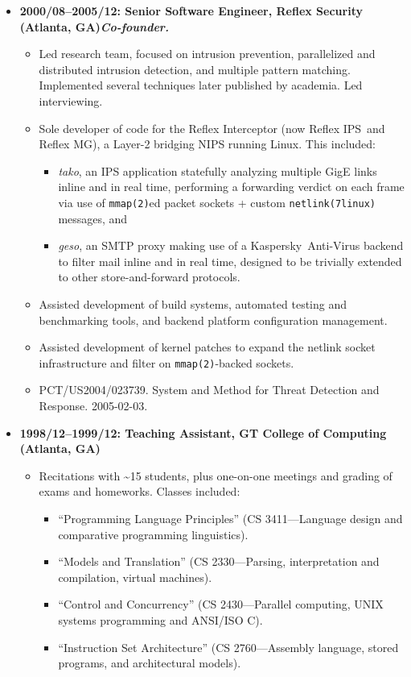 \documentclass{article}
\newenvironment{tightitemize}
{\begin{itemize}
  \setlength{\itemsep}{1pt}
  \setlength{\parskip}{0pt}
  \setlength{\parsep}{0pt}}
{\end{itemize}}
\begin{document}
\begin{tightitemize}
\pagebreak

\item \textbf{2000/08--2005/12: Senior Software Engineer, Reflex Security (Atlanta, GA)\hfill \tiny{\textit{Co-founder.}}}
\begin{tightitemize}
\item Led research team, focused on intrusion prevention, parallelized and
  distributed intrusion detection, and multiple pattern matching. Implemented
  several techniques later published by academia. Led interviewing.
\item Sole developer of code for the Reflex Interceptor (now Reflex IPS\texttrademark\ and
  Reflex MG\texttrademark), a Layer-2 bridging NIPS running Linux. This included:
\begin{tightitemize}
    \item \textit{tako}, an IPS application statefully analyzing multiple GigE links inline
      and in real time, performing a forwarding verdict on each frame via use
      of \texttt{mmap(2)}ed packet sockets + custom \texttt{netlink(7linux)} messages, and
    \item \textit{geso}, an SMTP proxy making use of a Kaspersky\texttrademark\ Anti-Virus backend to
      filter mail inline and in real time, designed to be trivially extended
      to other store-and-forward protocols.
\end{tightitemize}
\item Assisted development of build systems, automated testing and benchmarking tools, and backend
      platform configuration management.
\item Assisted development of kernel patches to expand the netlink socket
      infrastructure and filter on \texttt{mmap(2)}-backed sockets.
\item PCT/US2004/023739. System and Method for Threat Detection and Response. 2005-02-03.\hfill {}\\
\end{tightitemize}

\item \textbf{1998/12--1999/12: Teaching Assistant, GT College of Computing (Atlanta, GA)}
\begin{tightitemize}
\item Recitations with \textasciitilde15 students, plus one-on-one meetings and grading of exams
and homeworks. Classes included:
\begin{tightitemize}
\item ``Programming Language Principles'' (CS 3411---Language design and comparative programming linguistics).
\item ``Models and Translation'' (CS 2330---Parsing, interpretation and compilation, virtual machines).
\item ``Control and Concurrency'' (CS 2430---Parallel computing, UNIX systems programming and ANSI/ISO C).
\item ``Instruction Set Architecture'' (CS 2760---Assembly language, stored programs, and architectural models).\\
\end{tightitemize}
\end{tightitemize}


\end{tightitemize}
\end{document}
